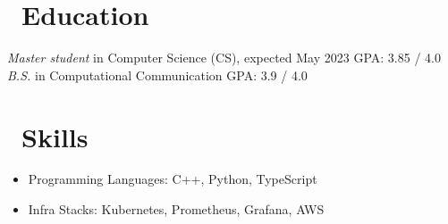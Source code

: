 \documentclass{resume}
\begin{document}



\section{\faGraduationCap\ Education}
\textit{Master student} in Computer Science (CS), expected May 2023
GPA: 3.85 / 4.0
\textit{B.S.} in Computational Communication
GPA: 3.9 / 4.0

\section{\faCogs\ Skills}
\begin{itemize}[parsep=0.5ex]
  \item Programming Languages: C++, Python, TypeScript
  \item Infra Stacks: Kubernetes, Prometheus, Grafana, AWS
\end{itemize}
\end{document}
